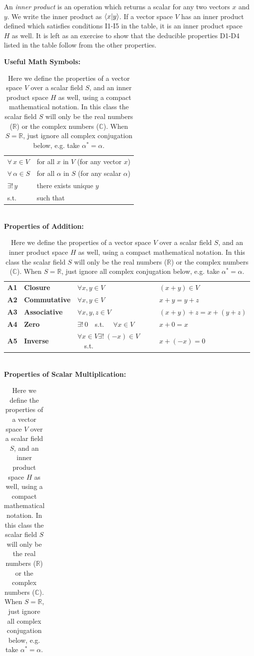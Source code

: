 \documentclass[12pt]{book}
\begin{document}
An {\em inner product} is an operation which returns a scalar for any two vectors $x$ and $y$.
We write the inner product as $\braket{x|y}$.  If a vector space $V$ has an inner product defined 
which satisfies conditions I1-I5 in the table, it is an inner product space $H$ as well.  It is left as an exercise to show that the deducible properties D1-D4 listed in the table follow from the other properties.

\begin{table}
\caption{ \label{tbl:ipspace} Here we define the properties of a vector space $V$ over a scalar field $S$, and an inner product space $H$ as well, using a compact mathematical notation.  In this class the scalar field $S$ will only be the real numbers ($\mathbb{R}$) or the complex numbers ($\mathbb{C}$).
When $S=\mathbb{R}$, just ignore all complex conjugation below, e.g. take $\alpha^* = \alpha$.}
\begin{center}
{\bf Useful Math Symbols:}\\
\begin{tabular}{ll}
  $\forall \, x \in V$ & for all $x$ in $V$ (for any vector $x$)\\
  $\forall \, \alpha \in S$ & for all $\alpha$ in $S$ (for any scalar $\alpha$) \\
  $\exists ! \, y$ & there exists unique $y$ \\
  s.t.          & such that \\
\end{tabular}\\    
\vskip 0.5cm
{\bf Properties of Addition:}\\
\begin{tabular}{llll}
{\bf A1} & {\bf Closure} & $\forall x,y \in V$ & $(x+y) \in V $\\
{\bf A2} & {\bf Commutative} & $\forall x,y \in V$ & $x+y=y+z$\\
{\bf A3} & {\bf Associative} & $\forall x,y,z \in V$ & $(x+y)+z = x+(y+z)$\\
{\bf A4} & {\bf Zero}        & $\exists !~0$~~s.t.~~ $\forall x \in V$ & $x+0 = x$ \\
{\bf A5} & {\bf Inverse} & $\forall x \in V \exists !\;(-x) \in V$~~s.t.~~& $x+(-x)=0$\\
\end{tabular} \\
\vskip 0.5cm
{\bf Properties of Scalar Multiplication:}\\
\begin{tabular}{llll}

\end{tabular}
\end{center}
\end{table}
\end{document}
